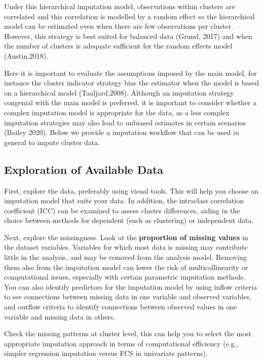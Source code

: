 \documentclass[
  article]{jss}
\begin{document}
Under this hierarchical imputation model, observations within clusters
are correlated and this correlation is modelled by a random effect so
the hierarchical model can be estimated even when there are few
observations per cluster. However, this strategy is best suited for
balanced data (Grund, 2017) and when the number of clusters is adequate
sufficient for the random effects model (Austin,2018).

Here it is important to evaluate the assumptions imposed by the main
model, for instance the cluster indicator strategy bias the estimator
when the model is based on a hierarchical model (Taaljard,2008).
Although an imputation strategy congenial with the main model is
preferred, it is important to consider whether a complex imputation
model is appropriate for the data, as a less complex imputation
strategies may also lead to unbiased estimates in certain scenarios
(Bailey 2020). Below we provide a imputation workflow that can be used
in general to impute cluster data.

\hypertarget{exploration-of-available-data}{%
\subsection{Exploration of Available
Data}\label{exploration-of-available-data}}

First, explore the data, preferably using visual tools. This will help
you choose an imputation model that suits your data. In addition, the
intraclass correlation coefficient (ICC) can be examined to assess
cluster differences, aiding in the choice between methods for dependent
(such as clustering) or independent data.

Next, explore the missingness. Look at the
\textbf{proportion of missing values} in the dataset variables.
Variables for which most data is missing may contribute little in the
analysis, and may be removed from the analysis model. Removing them also
from the imputation model can lower the risk of multicollinearity or
computational issues, especially with certain parametric imputation
methods. You can also identify predictors for the imputation model by
using inflow criteria to see connections between missing data in one
variable and observed variables, and outflow criteria to identify
connections between observed values in one variable and missing data in
others.

Check the missing patterns at cluster level, this can help you to select
the most appropriate imputation approach in terms of computational
efficiency (e.g., simpler regression imputation versus FCS in univariate
patterns).
\end{document}
